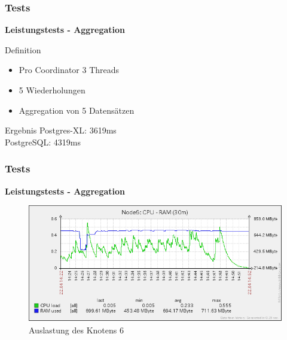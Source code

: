 \documentclass{beamer}
\begin{document}
\begin{frame}\frametitle{Tests}
\centering\textbf{Leistungstests - Aggregation}

\vspace{\baselineskip}

\begin{block}{Definition}
\begin{itemize}
\item Pro Coordinator 3 Threads
\item 5 Wiederholungen
\item Aggregation von 5 Datensätzen %
\end{itemize}
\end{block}

\vspace{\baselineskip}

\begin{block}{Ergebnis}
Postgres-XL: 3619ms\\
PostgreSQL: 4319ms
\end{block}
\end{frame}

\begin{frame}\frametitle{Tests}
\centering\textbf{Leistungstests - Aggregation}
\begin{figure}
\centering
\includegraphics[width=1\hsize]{jdbc_aggregation_Testlauf_node6.png}
\caption{Auslastung des Knotens 6}
\end{figure}
\end{frame}
\end{document}
